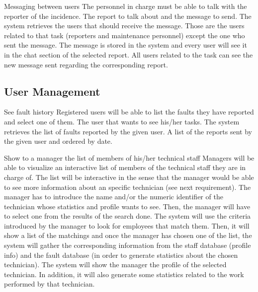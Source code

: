 \begin{requirement}{Messaging between users}
\reqdesc The personnel in charge must be able to talk with the reporter of the incidence.
\reqin The report to talk about and the message to send.
\reqsteps The system retrieves the users that should receive the message. Those are the users related to that task (reporters and maintenance personnel) except the one who sent the message. The message is stored in the system and every user will see it in the chat section of the selected report.
\reqout All users related to the task can see the new message sent regarding the corresponding report.
\end{requirement}


\subsection{User Management}

\begin{requirement}{See fault history}
\reqdesc Registered users will be able to list the faults they have reported and select one of them.
\reqin The user that wants to see his/her tasks.
\reqsteps The system retrieves the list of faults reported by the given user.
\reqout A list of the reports sent by the given user and ordered by date.
\end{requirement}

\begin{requirement}{Show to a manager the list of members of his/her technical staff}
\reqdesc Managers will be able to visualize an interactive list of members of the technical staff they are in charge of. The list will be interactive in the sense that the manager would be able to see more information about an specific technician (see next requirement).
\reqin The manager has to introduce the name and/or the numeric identifier of the technician whose statistics and profile wants to see. Then, the manager will have to select one from the results of the search done.
\reqsteps The system will use the criteria introduced by the manager to look for employees that match them. Then, it will show a list of the matchings and once the manager has chosen one of the list, the system will gather the corresponding information from the staff database (profile info) and the fault database (in order to generate statistics about the chosen technician).
\reqout The system will show the manager the profile of the selected technician. In addition, it will also generate some statistics related to the work performed by that technician.
\end{requirement}


